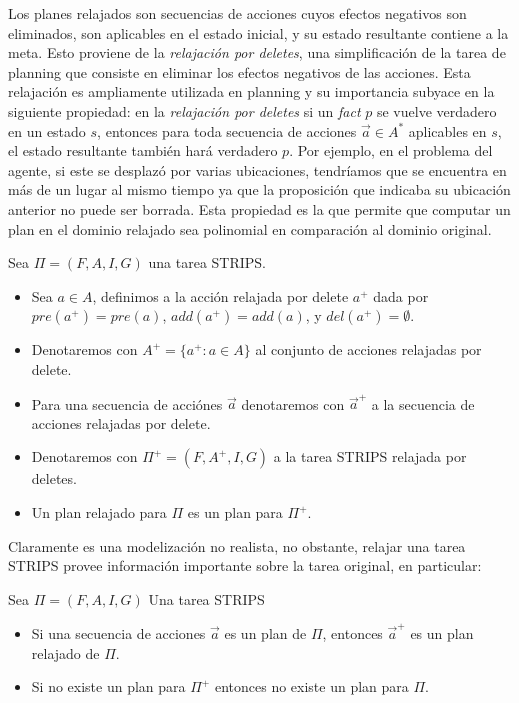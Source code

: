 Los planes relajados son secuencias de acciones cuyos efectos negativos son
eliminados, son aplicables en el estado inicial, y su estado resultante contiene
a la meta. Esto proviene de la \emph{relajación por deletes}, una simplificación
de la tarea de planning que consiste en eliminar los efectos negativos de las
acciones. Esta relajación es ampliamente utilizada en planning y su importancia
subyace en la siguiente propiedad: en la \emph{relajación por deletes} si un
\emph{fact} $p$ se vuelve verdadero en un estado $s$, entonces para toda
secuencia de acciones $\vec{a} \in A^{*}$ aplicables en $s$, el estado
resultante también hará verdadero $p$. Por ejemplo, en el problema del agente,
si este se desplazó por varias ubicaciones, tendríamos que se encuentra en más
de un lugar al mismo tiempo ya que la proposición que indicaba su ubicación
anterior no puede ser borrada. Esta propiedad es la que permite que computar un
plan en el dominio relajado sea polinomial en comparación al dominio original.

\begin{mydef}
    Sea $\Pi = (F, A, I, G)$ una tarea STRIPS.
    \begin{itemize}
        \item Sea $a \in A$, definimos a la acción relajada por delete $a^{+}$
        dada por $pre(a^{+}) = pre(a)$, $add(a^{+}) = add(a)$, y $del(a^{+}) =
        \emptyset$.

        \item Denotaremos con $A^{+} = \{a^{+} : a \in A\}$ al conjunto de
        acciones relajadas por delete.

        \item Para una secuencia de acciónes $\vec{a}$ denotaremos con
        $\vec{a}^{+}$ a la secuencia de acciones relajadas por delete.

        \item Denotaremos con $\Pi^{+} = (F, A^{+}, I, G)$ a la tarea STRIPS
        relajada por deletes.

        \item Un plan relajado para $\Pi$ es un plan para $\Pi^{+}$.
    \end{itemize}
\end{mydef}

Claramente es una modelización no realista, no obstante, relajar una tarea
STRIPS provee información importante sobre la tarea original, en particular:

\begin{lemma}
\label{lit:delete_relaxed_property}
Sea $\Pi = (F, A, I, G)$ Una tarea STRIPS
\begin{itemize}
    \item Si una secuencia de acciones $\vec{a}$ es un plan de $\Pi$, entonces
    $\vec{a}^{+}$ es un plan relajado de $\Pi$.
    \item Si no existe un plan para $\Pi^{+}$ entonces no existe un plan para
    $\Pi$.
\end{itemize}
\end{lemma}


